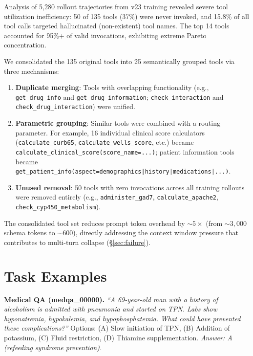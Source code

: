 \documentclass{article}
\begin{document}
Analysis of 5,280 rollout trajectories from v23 training revealed severe tool utilization inefficiency: 50 of 135 tools (37\%) were never invoked, and 15.8\% of all tool calls targeted hallucinated (non-existent) tool names. The top 14 tools accounted for 95\%+ of valid invocations, exhibiting extreme Pareto concentration.

We consolidated the 135 original tools into 25 semantically grouped tools via three mechanisms:

\begin{enumerate}[leftmargin=*,itemsep=1pt]
    \item \textbf{Duplicate merging}: Tools with overlapping functionality (e.g., \texttt{get\_drug\_info} and \texttt{get\_drug\_information}; \texttt{check\_interaction} and \texttt{check\_drug\_interaction}) were unified.
    \item \textbf{Parametric grouping}: Similar tools were combined with a routing parameter. For example, 16 individual clinical score calculators (\texttt{calculate\_curb65}, \texttt{calculate\_wells\_score}, etc.) became \texttt{calculate\_clinical\_score(score\_name=...)}; patient information tools became \texttt{get\_patient\_info(aspect=demographics|history|medications|...)}.
    \item \textbf{Unused removal}: 50 tools with zero invocations across all training rollouts were removed entirely (e.g., \texttt{administer\_gad7}, \texttt{calculate\_apache2}, \texttt{check\_cyp450\_metabolism}).
\end{enumerate}

The consolidated tool set reduces prompt token overhead by ${\sim}5\times$ (from ${\sim}3{,}000$ schema tokens to ${\sim}600$), directly addressing the context window pressure that contributes to multi-turn collapse (\S\ref{sec:failure}).


\section{Task Examples}
\label{app:tasks}

\textbf{Medical QA (medqa\_00000).} \emph{``A 69-year-old man with a history of alcoholism is admitted with pneumonia and started on TPN. Labs show hyponatremia, hypokalemia, and hypophosphatemia. What could have prevented these complications?''} Options: (A) Slow initiation of TPN, (B) Addition of potassium, (C) Fluid restriction, (D) Thiamine supplementation. \emph{Answer: A (refeeding syndrome prevention).}
\end{document}
